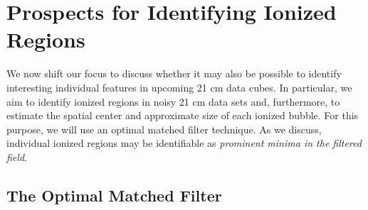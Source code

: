 \section{Prospects for Identifying Ionized Regions} \label{sec:Bubbleionprospects}

We now shift our focus to discuss whether it may also be possible
to identify interesting individual features in upcoming 21 cm data cubes.
In particular, we aim to identify ionized regions in noisy 21 cm data sets
and, furthermore, to estimate the spatial center and approximate size of each ionized bubble.
For this purpose, we will use an optimal matched filter technique. As we
discuss, individual
ionized regions may be identifiable as {\em prominent minima in the
filtered field}.

\subsection{The Optimal Matched Filter} \label{sec:Bubbleoptimal}


